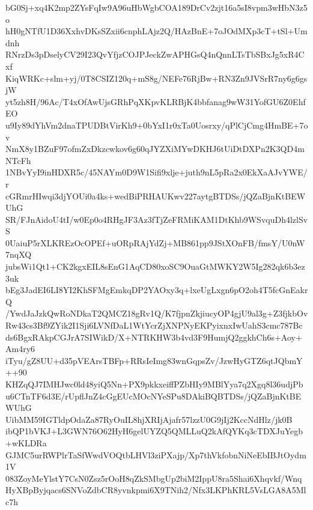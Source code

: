 bG0Sj+xq4K2mp2ZYsFqIw9A96uHbWgbCOA189DrCv2zjt16a5sI8vpm3wHbN3z5o
hH0gNTfU1D36XxhvDKsSZxii6cnphLAjz2Q/HAzBnE+7oJOdMXp3cT+tSl+Umdnh
RNrzDs3pDselyCV29I23QvYfjzCOJPJeckZwAPHGsQ4nQnnLTsTbSBxJg5xR4Cxf
KiqWRKc+slm+yj/0T8CSIZ120q+mS8g/NEFe76RjBw+RN3Zn9JVSrR7ny6g6gsjW
yt5zh8H/96Ac/T4xOfAwUjsGRhPqXKpvKLRBjK4bbfanag9wW31YofGU6Z0EhfEO
u9Iy89dYhVm2dnaTPUDBtVirKh9+0bYxI1r0xTa0Uosrxy/qPlCjCmg4HmBE+7ov
NmX8y1BZuF97ofmZxDkzcwkov6g60qJYZXiMYwDKHJ6tUiDtDXPn2K3QD4mNTcFh
1NBvYyI9inHDXR5c/45NAYm0D9W1Sifi9xlje+juth9nL5pRa2x0EkXaAJvYWE/r
cGRmrHIwqi3djYOUi0a4ks+wedBiPRHAUKwv227aytgBTDSs/jQZaBjnKtBEWUhG
SR/FJnAidoU4tI/w0Ep0o4RHgJF3Az3fTjZeFRMiKAM1DtKhb9WSvquDh4lzlSvS
0UaiuP5rXLKREzOcOPEf+uORpRAjYdZj+MB861pp9JStXOnFB/fmsY/U0nW7nqXQ
jubsWi1Qt1+CK2kgxEIL8sEnG1AqCD80xoSC9OuaGtMWKY2W5Ig282qk6b3ez3uk
bEg3JadEI6LI8YI2KhSFMgEmkqDP2YAOxy3q+lxeUgLxgn6pO2oh4T5fcGnEakrQ
/YwdJaJzkQwRoNDkaT2QMCZ18gRv1Q/K7fjpnZkjiucyOP4gjU9al3g+Z3fjkbOv
Rw43cs3Bf9ZYik2I1Sji6LVNfDaL1WtYcrZjXNPNyEKPyixnxIwUahS3cmc787Bc
ds6BgxRAkpCGJrA7SIWikD/X+NTRKHW3b4vd3F9HumjQ2ggkhCh6s+Aoy+Am4ry6
iTyu/gZ8UU+d35pVEArsTBFp+RRsIeImg83wnGqpsZv/JzwHyGTZ6qtJQbmY++90
KHZqQJ7IMHJwc0ld48yiQ5Nn+PX9pkkxeiffPZbHIy9MBlYya7q2Xgq8l36udjPb
u6CTnTF6d3E/rUpflJnZ4cGgEUcMOcNYeSPu8DAkiBQBTDSs/jQZaBjnKtBEWUhG
UibMM59IGTldpOdaZa87RyOuIL8hjXRIjAjafr57lzzU0G9jIj2KccNdHlz/jk0B
ibQP1bVKJ+L3GWN76O62HyH6gelUYZQ5QMLLuQ2kAfQYKq3cTDXJuYegb+wKLDRa
GJMC5urRWPlrTaSfWwdVOQtbLHVl3ziPXajp/Xp7thVkfobnNiNeEbIBJtOydm1V
083ZoyMeYlstY7CsN0Zsz5rOoH8qZkSMbgUp2biM2IppU8ra5Shai6Xhqvkf/Wnq
HyXBpByjqacs6SNVoZdbCR8yvnkpmi6X9TNih2/Nfx3LKPhKRL5VsLGA8A5Mlc7h
